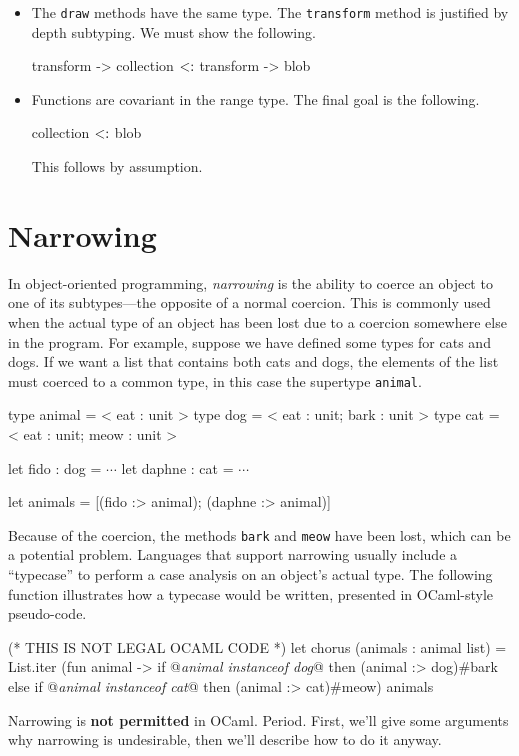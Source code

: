 \begin{itemize}
\item The \hbox{\lstinline/draw/} methods have the same type.
The \hbox{\lstinline/transform/} method is justified by depth subtyping.
We must show the following.

\begin{ocaml}
transform -> collection $\mathrel{\hbox{<:}}$ transform -> blob
\end{ocaml}

\item Functions are covariant in the range type.  The final goal is the following.

\begin{ocaml}
collection $\mathrel{\hbox{<:}}$ blob
\end{ocaml}

This follows by assumption.
\end{itemize}

\section{Narrowing}
\label{section:narrowing}

In object-oriented programming, \emph{narrowing} is the ability to coerce an object to one of its
subtypes---the opposite of a normal coercion.  This is commonly used when the actual type of an
object has been lost due to a coercion somewhere else in the program.  For example, suppose we have
defined some types for cats and dogs.  If we want a list that contains both cats and dogs, the
elements of the list must coerced to a common type, in this case the supertype \hbox{\lstinline/animal/}.

\begin{ocaml}
type animal = < eat : unit >
type dog = < eat : unit; bark : unit >
type cat = < eat : unit; meow : unit >

let fido : dog = $\cdots$
let daphne : cat = $\cdots$

let animals = [(fido :> animal); (daphne :> animal)]
\end{ocaml}
%
Because of the coercion, the methods \hbox{\lstinline/bark/} and \hbox{\lstinline/meow/} have been lost, which can
be a potential problem.  Languages that support narrowing usually include a ``typecase'' to perform
a case analysis on an object's actual type.  The following function illustrates how a typecase
would be written, presented in OCaml-style pseudo-code.

\begin{ocaml}
(* THIS IS NOT LEGAL OCAML CODE *)
let chorus (animals : animal list) =
   List.iter (fun animal ->
      if @\textit{animal instanceof dog}@ then (animal :> dog)#bark
      else if @\textit{animal instanceof cat}@ then (animal :> cat)#meow) animals
\end{ocaml}
%
Narrowing is \textbf{not permitted} in OCaml.  Period.  First, we'll give some arguments why
narrowing is undesirable, then we'll describe how to do it anyway.

